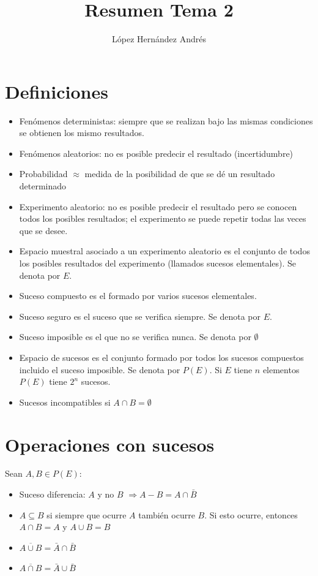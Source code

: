 \documentclass{pye-resumen}
\title{Resumen Tema 2}
\author{López Hernández Andrés}
\begin{document}
	\maketitle
	\section{Definiciones}
	\begin{itemize}
		\item Fenómenos deterministas: siempre que se	realizan bajo las mismas condiciones se obtienen los mismo resultados.
		\item Fenómenos aleatorios: no es posible predecir el resultado (incertidumbre)
		\item Probabilidad $\approx$ medida de la posibilidad de que se dé un resultado determinado
		\item Experimento aleatorio: no es posible predecir el resultado pero se conocen todos los posibles resultados; el experimento se puede repetir	todas las veces que se desee.
		\item Espacio muestral asociado a un experimento aleatorio es el conjunto de todos los posibles resultados del experimento (llamados sucesos elementales). Se denota por $E$.
		\item Suceso compuesto es el formado por varios sucesos elementales.
		\item Suceso seguro es el suceso que se verifica siempre. Se denota por $E$.
		\item Suceso imposible es el que no se verifica nunca. Se denota por $\emptyset$
		\item Espacio de sucesos es el conjunto formado por todos los sucesos compuestos incluido el suceso imposible. Se denota por $P(E)$. Si $E$ tiene $n$ elementos $P(E)$ tiene $2^n$ sucesos.
		\item Sucesos incompatibles si $A \cap B = \emptyset$
	\end{itemize}
		
	\section{Operaciones con sucesos}
		Sean $A,B \in P(E):$
		\begin{itemize}
			\item Suceso diferencia: $A$ y no $B$ $\Rightarrow A-B = A\cap\bar{B}$
			\item $A\subseteq B$ si siempre que ocurre $A$ también ocurre $B$. Si esto ocurre, entonces $A\cap B = A$ y $A \cup B = B$
			\item $\overline{A\cup B} = \bar{A} \cap \bar{B} $
			\item $\overline{A\cap B} = \bar{A} \cup \bar{B}$
		\end{itemize}
\end{document}
